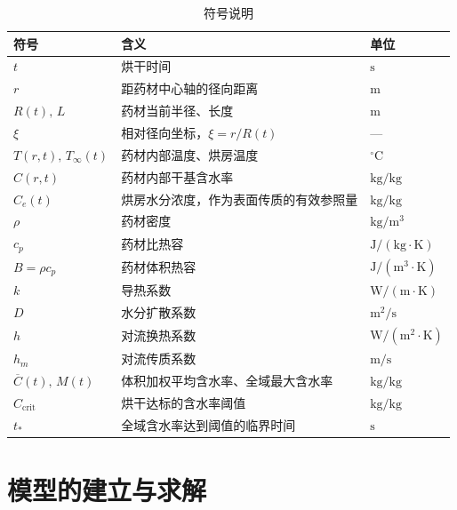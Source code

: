 \documentclass[UTF8,a4paper]{ctexart}
\begin{document}
\begingroup
\renewcommand{\arraystretch}{1.05}
\setlength{\LTleft}{\fill}
\setlength{\LTright}{\fill}
\setlength{\LTpre}{0pt}
\setlength{\LTpost}{\medskipamount}
\begin{longtable}{@{}
  >{\centering\arraybackslash}p{}
  >{\centering\arraybackslash}p{}
  >{\centering\arraybackslash}p{}
@{}}
\caption{符号说明}\label{tab:symbols}\\
\toprule
\textbf{符号} & \textbf{含义} & \textbf{单位} \\
\midrule
\endfirsthead
\toprule
\endhead
\midrule
\endfoot
\bottomrule
\endlastfoot
\(t\) & 烘干时间 & \(\mathrm{s}\) \\
\(r\) & 距药材中心轴的径向距离 & \(\mathrm{m}\) \\
\(R(t),\,L\) & 药材当前半径、长度 & \(\mathrm{m}\) \\
\(\xi\) & 相对径向坐标，\(\xi=r/R(t)\) & — \\
\(T(r,t),\,T_\infty(t)\) & 药材内部温度、烘房温度 & \({}^\circ\mathrm{C}\) \\
\(C(r,t)\) & 药材内部干基含水率 & \(\mathrm{kg/kg}\) \\
\(C_e(t)\) & 烘房水分浓度，作为表面传质的有效参照量 & \(\mathrm{kg/kg}\) \\
\(\rho\) & 药材密度 & \(\mathrm{kg/m^3}\) \\
\(c_p\) & 药材比热容 & \(\mathrm{J/(kg\cdot K)}\) \\
\(B=\rho c_p\) & 药材体积热容 & \(\mathrm{J/(m^3\cdot K)}\) \\
\(k\) & 导热系数 & \(\mathrm{W/(m\cdot K)}\) \\
\(D\) & 水分扩散系数 & \(\mathrm{m^2/s}\) \\
\(h\) & 对流换热系数 & \(\mathrm{W/(m^2\cdot K)}\) \\
\(h_m\) & 对流传质系数 & \(\mathrm{m/s}\) \\
\(\overline C(t),\,M(t)\) & 体积加权平均含水率、全域最大含水率 & \(\mathrm{kg/kg}\) \\
\(C_{\mathrm{crit}}\) & 烘干达标的含水率阈值 & \(\mathrm{kg/kg}\) \\
\(t_*\) & 全域含水率达到阈值的临界时间 & \(\mathrm{s}\) \\
\end{longtable}
\endgroup





\section{模型的建立与求解}
\end{document}
